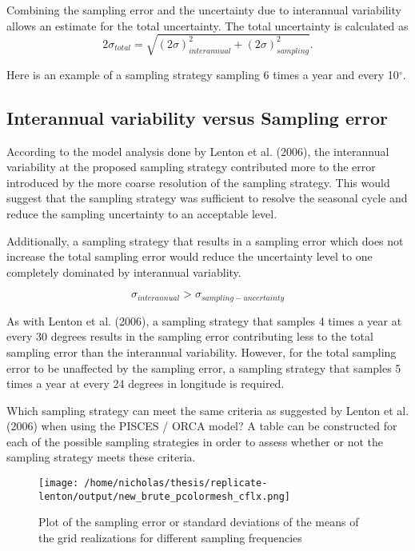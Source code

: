 \documentclass[11pt, a4paper]{article}
\numberwithin{figure}{section}
\numberwithin{table}{section}
\begin{document}
Combining the sampling error and the uncertainty due to interannual
variability allows an estimate for the total uncertainty. The total
uncertainty is calculated as
\begin{equation} 
2\sigma_{total} = \sqrt{(2\sigma)^{2}_{interannual} + (2\sigma)^{2}_{sampling}}.
\end{equation}

Here is an example of a sampling strategy sampling 6 times a year and
every 10$^{\circ}$.


        
\subsection{Interannual variability versus Sampling error}
According to the model analysis done by Lenton et al. (2006), the interannual 
variability at the proposed sampling strategy contributed more to the error 
introduced by the more coarse resolution of the sampling strategy. This would 
suggest that the sampling strategy was sufficient to resolve the seasonal
cycle and reduce the sampling uncertainty to an acceptable level.

Additionally, a sampling strategy that results in a sampling error 
which does not increase the total sampling error would reduce
the uncertainty level to one completely dominated by interannual
variablity.

	\begin{equation}
	\sigma_{interannual} > \sigma_{sampling-uncertainty}
	\end{equation}

As with Lenton et al. (2006), a sampling strategy that samples 4
times a year at every 30 degrees results in the sampling error 
contributing less to the total sampling error than the interannual
variability. 
However, for the total sampling error to be unaffected by the 
sampling error, a sampling strategy that samples 5 times a year at 
every 24 degrees in longitude is required.

Which sampling strategy can meet the same criteria as suggested by Lenton et
al. (2006) when using the PISCES / ORCA model? A table can be constructed for 
each of the possible sampling strategies in order to assess whether or not the
sampling strategy meets these criteria.

  \begin{figure}[hhtbp]
    \caption{Plot of the sampling error or standard deviations of 
           the means of the grid realizations for different sampling frequencies}
  \centering
    \texttt{[image: /home/nicholas/thesis/replicate-lenton/output/new\_brute\_pcolormesh\_cflx.png]}
  \end{figure}
    
\end{document}
